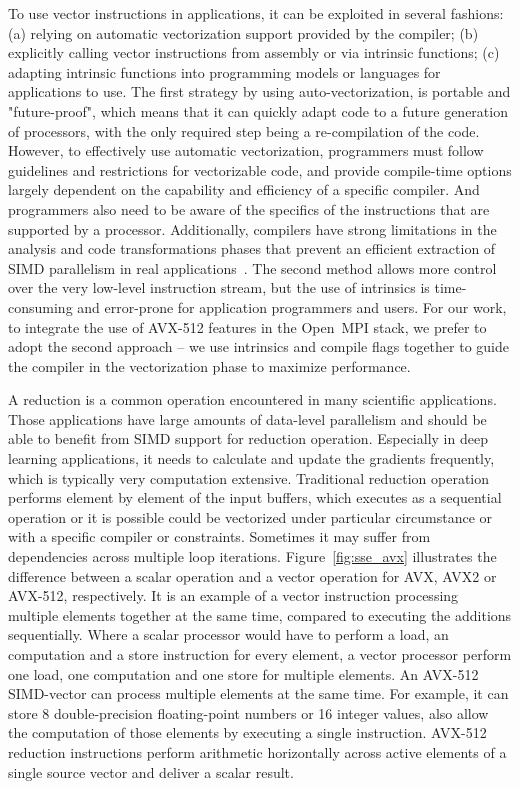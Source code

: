 \documentclass[sigconf]{acmart}
\newcommand{\ompi}[0]{Open~MPI\xspace}
\begin{document}
To use vector instructions in applications, it can be exploited in several fashions:
(a) relying on automatic vectorization support provided by the compiler;
(b) explicitly calling vector instructions from assembly or via intrinsic functions;
(c) adapting intrinsic functions into programming models or languages
for applications to use.
%
The first strategy by using auto-vectorization, is portable and
"future-proof", which means that it can quickly adapt code to a future
generation of processors, with the only required step being a
re-compilation of the code. However, to effectively use automatic
vectorization, programmers must follow guidelines and restrictions for
vectorizable code, and provide compile-time options largely dependent
on the capability and efficiency of a specific compiler.
%
And programmers also need to be aware of the specifics of the
instructions that are supported by a processor.  Additionally,
compilers have strong limitations in the analysis and code
transformations phases that prevent an efficient extraction of SIMD
parallelism in real applications~\cite{auto_Evaluation}.
%
The second method allows more control over the very low-level
instruction stream, but the use of intrinsics is time-consuming and
error-prone for application programmers and users.
%
For our work, to integrate the use of AVX-512 features in the \ompi
stack, we prefer to adopt the second approach -- we use intrinsics and
compile flags together to guide the compiler in the vectorization
phase to maximize performance.

A reduction is a common operation encountered in many scientific applications.
Those applications have large amounts of data-level parallelism and should be able
to benefit from SIMD support for reduction operation. Especially in deep learning applications,
it needs to calculate and update the gradients frequently, which is typically very computation extensive.
Traditional reduction operation performs element by element of the input buffers,
which executes as a sequential operation or it is possible could be vectorized
under particular circumstance or with a specific compiler or constraints. Sometimes
it may suffer from dependencies across multiple loop iterations.
%
Figure~\ref{fig:sse_avx} illustrates the difference between a scalar operation and
a vector operation for AVX, AVX2 or AVX-512, respectively.
%
It is an example of a vector instruction processing multiple elements together at the same time,
compared to executing the additions sequentially. Where a scalar processor would have to perform a load, an
computation and a store instruction for every element, a vector processor perform one load, one computation and
one store for multiple elements.
An AVX-512 SIMD-vector can process multiple elements at
the same time. For example, it can store 8 double-precision floating-point numbers or 16 integer values, also allow the computation of those elements by executing a single instruction.
AVX-512 reduction instructions perform arithmetic horizontally across active elements of a
single source vector and deliver a scalar result.
\end{document}
